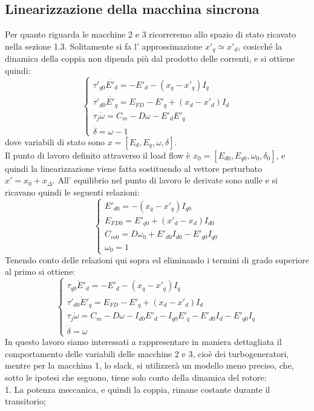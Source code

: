 \documentclass[Lau,noexaminfo]{sapthesis}
\begin{document}
	\subsection{Linearizzazione della macchina sincrona}
	Per quanto riguarda le macchine 2 e 3 ricorreremo allo spazio di stato ricavato nella sezione 1.3. Solitamente si fa l' approssimazione $x'_q\simeq x'_d$, cosicché la dinamica della coppia non dipenda più dal prodotto delle correnti, e si ottiene quindi:
	\[
	\begin{cases}
	\tau'_{q0} \dot{E'_d}=-E'_d-(x_q-x'_q)I_q\\
	\tau'_{d0}\dot{E'_q}=E_{FD}-E'_q+(x_d-x'_d)I_d\\
	\tau_j\dot{\omega}=C_m-D\omega-E'_dE'_q\\
	\dot{\delta}=\omega-1
	\end{cases}
	\]
	dove variabili di stato sono $x=[E_d,E_q,\omega,\delta]$.\\
	Il punto di lavoro definito attraverso il load flow è $x_0=[E_{d0},E_{q0},\omega_0,\delta_0]$, e quindi la linearizzazione viene fatta sostituendo al vettore perturbato \\$x'=x_0+x_\Delta$. All' equilibrio nel punto di lavoro le derivate sono nulle e si ricavano quindi le seguenti relazioni:\\
	\[
	\begin{cases}
	E'_{d0}=-(x_q-x'_q)I_{q0}\\
	E_{FD0}=E'_{q0}+(x'_d-x_d)I_{d0}\\
	C_{m0}=D\omega_0+E'_{d0}I_{d0}-E'_{q0}I_{q0}\\
	\omega_0=1
	\end{cases}
	\]
	Tenendo conto delle relazioni qui sopra ed eliminando i termini di grado superiore al primo si ottiene:
	\[
	\begin{cases}
	\tau_{q0}\dot{E}'_d= -E'_d-(x_q-x'_q)I_q\\
	\tau'_{d0}\dot{E}'_q=E_{FD}-E'_q+(x_d-x'_d)I_d\\
	\tau_j\dot{\omega}=C_m-D\omega-I_{d0}E'_d-I_{q0}E'_q-E'_{d0}I_d-E'_{q0}I_q\\
	\dot{\delta}=\omega
	\end{cases}
	\]
	In questo lavoro siamo interessati a rappresentare in maniera dettagliata il comportamento delle variabili delle macchine 2 e 3, cioè dei turbogeneratori, mentre per la macchina 1, lo slack, si utilizzerà un modello meno preciso, che, sotto le ipotesi che seguono, tiene solo conto della dinamica del rotore:\\
	1. La potenza meccanica, e quindi la coppia, rimane costante durante il transitorio;\\
\end{document}
